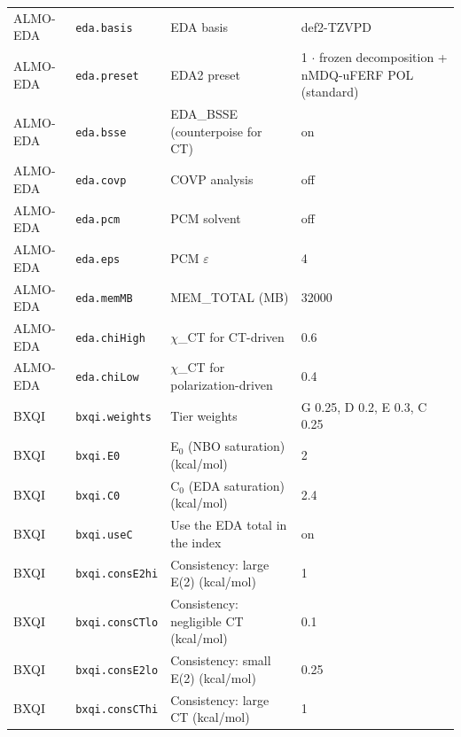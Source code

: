 \documentclass[journal=jcisd8,manuscript=suppinfo]{achemso}
\begin{document}
\begin{singlespace}
{\begin{longtable}{llp{4.2cm}l}
ALMO-EDA & \texttt{eda.basis} & EDA basis & \parbox[t]{5.0cm}{\raggedright def2-TZVPD}\\
ALMO-EDA & \texttt{eda.preset} & EDA2 preset & \parbox[t]{5.0cm}{\raggedright 1 $\cdot$ frozen decomposition + nMDQ-uFERF POL (standard)}\\
ALMO-EDA & \texttt{eda.bsse} & EDA\_BSSE (counterpoise for CT) & \parbox[t]{5.0cm}{\raggedright on}\\
ALMO-EDA & \texttt{eda.covp} & COVP analysis & \parbox[t]{5.0cm}{\raggedright off}\\
ALMO-EDA & \texttt{eda.pcm} & PCM solvent & \parbox[t]{5.0cm}{\raggedright off}\\
ALMO-EDA & \texttt{eda.eps} & PCM $\varepsilon$ & \parbox[t]{5.0cm}{\raggedright 4}\\
ALMO-EDA & \texttt{eda.memMB} & MEM\_TOTAL (MB) & \parbox[t]{5.0cm}{\raggedright 32000}\\
ALMO-EDA & \texttt{eda.chiHigh} & $\chi$\_CT for CT-driven & \parbox[t]{5.0cm}{\raggedright 0.6}\\
ALMO-EDA & \texttt{eda.chiLow} & $\chi$\_CT for polarization-driven & \parbox[t]{5.0cm}{\raggedright 0.4}\\
BXQI & \texttt{bxqi.weights} & Tier weights & \parbox[t]{5.0cm}{\raggedright G 0.25, D 0.2, E 0.3, C 0.25}\\
BXQI & \texttt{bxqi.E0} & E$_0$ (NBO saturation) (kcal/mol) & \parbox[t]{5.0cm}{\raggedright 2}\\
BXQI & \texttt{bxqi.C0} & C$_0$ (EDA saturation) (kcal/mol) & \parbox[t]{5.0cm}{\raggedright 2.4}\\
BXQI & \texttt{bxqi.useC} & Use the EDA total in the index & \parbox[t]{5.0cm}{\raggedright on}\\
BXQI & \texttt{bxqi.consE2hi} & Consistency: large E(2) (kcal/mol) & \parbox[t]{5.0cm}{\raggedright 1}\\
BXQI & \texttt{bxqi.consCTlo} & Consistency: negligible CT (kcal/mol) & \parbox[t]{5.0cm}{\raggedright 0.1}\\
BXQI & \texttt{bxqi.consE2lo} & Consistency: small E(2) (kcal/mol) & \parbox[t]{5.0cm}{\raggedright 0.25}\\
BXQI & \texttt{bxqi.consCThi} & Consistency: large CT (kcal/mol) & \parbox[t]{5.0cm}{\raggedright 1}\\
\end{longtable}}


\end{singlespace}
\end{document}
